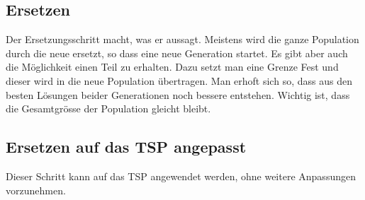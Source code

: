 %
%
%
%
\subsection{Ersetzen
\label{varalgbuch:paper:varalg:subsection:replacement}}
Der Ersetzungsschritt macht, was er aussagt. Meistens wird die ganze 
Population durch die neue ersetzt, so dass eine neue Generation startet.
Es gibt aber auch die Möglichkeit einen Teil zu erhalten. Dazu setzt man eine 
Grenze Fest und dieser wird in die neue Population übertragen. Man erhoft sich so, 
dass aus den besten Lösungen beider Generationen noch bessere entstehen.
Wichtig ist, dass die Gesamtgrösse der Population gleicht bleibt.

\subsection{Ersetzen auf das TSP angepasst
\label{buch:paper:varalg:subsection:replacement_tsp}}
Dieser Schritt kann auf das TSP angewendet werden, ohne weitere
Anpassungen vorzunehmen.
